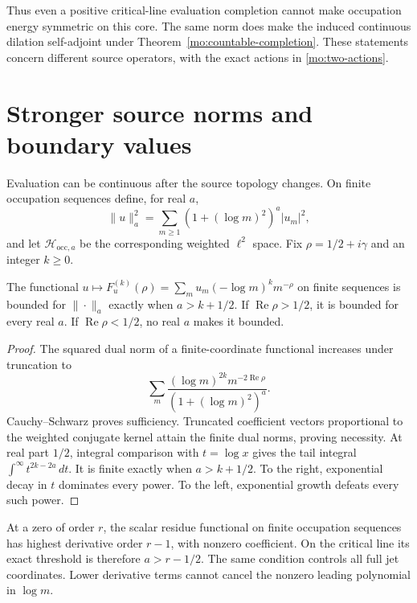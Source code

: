 Thus even a positive critical-line evaluation completion cannot
make occupation energy symmetric on this core. The same norm
does make the induced continuous dilation self-adjoint under
Theorem~\ref{mo:countable-completion}. These statements concern different
source operators, with the exact actions in \eqref{mo:two-actions}.



\section{Stronger source norms and boundary values}

Evaluation can be continuous after the source topology changes.
On finite occupation sequences define, for real $a$,
\[
 \|u\|_a^2=\sum_{m\geq1}(1+(\log m)^2)^a|u_m|^2,
\]
and let $\mathscr H_{\mathrm{occ},a}$ be the corresponding weighted
$\ell^2$ space. Fix $\rho=1/2+i\gamma$ and an integer $k\geq0$.

\begin{proposition}
\label{mo:weight-threshold}
The functional
$u\mapsto F_u^{(k)}(\rho)=\sum_m u_m(-\log m)^k m^{-\rho}$
on finite sequences is bounded for $\|\cdot\|_a$ exactly when
$a>k+1/2$. If $\operatorname{Re}\rho>1/2$, it is bounded for
every real $a$. If $\operatorname{Re}\rho<1/2$, no real $a$
makes it bounded.
\end{proposition}
\begin{proof}
The squared dual norm of a finite-coordinate functional increases
under truncation to
\[
 \sum_m\frac{(\log m)^{2k}m^{-2\operatorname{Re}\rho}}
                    {(1+(\log m)^2)^a}.
\]
Cauchy--Schwarz proves sufficiency. Truncated coefficient vectors
proportional to the weighted conjugate kernel attain the finite
dual norms, proving necessity. At real part $1/2$, integral
comparison with $t=\log x$ gives the tail integral
$\int^\infty t^{2k-2a}\,dt$. It is finite exactly when
$a>k+1/2$. To the right, exponential decay in $t$ dominates every
power. To the left, exponential growth defeats every such power.
\end{proof}

At a zero of order $r$, the scalar residue functional on finite
occupation sequences has highest derivative order $r-1$, with
nonzero coefficient. On the critical line its exact threshold
is therefore $a>r-1/2$. The same condition controls all full jet
coordinates. Lower derivative terms cannot cancel the nonzero
leading polynomial in $\log m$.

